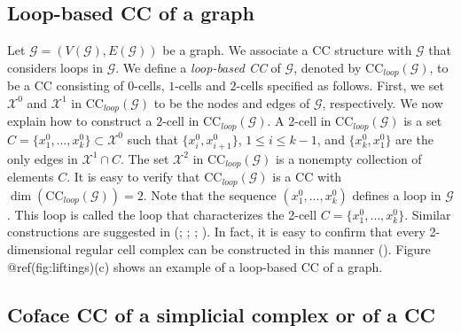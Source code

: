 \documentclass[
  12pt,
]{krantz}
\begin{document}
\subsection{Loop-based CC of a graph}\label{loop-based-cc-of-a-graph}

Let \(\mathcal{G}=(V(\mathcal{G}),E(\mathcal{G}))\) be a graph. We
associate a CC structure with \(\mathcal{G}\) that considers loops in
\(\mathcal{G}\). We define a \emph{loop-based CC} of \(\mathcal{G}\),
denoted by \(\mbox{CC}_{loop}(\mathcal{G})\), to be a CC consisting of
\(0\)-cells, \(1\)-cells and \(2\)-cells specified as follows. First, we
set \(\mathcal{X}^0\) and \(\mathcal{X}^1\) in
\(\mbox{CC}_{loop}(\mathcal{G})\) to be the nodes and edges of
\(\mathcal{G}\), respectively. We now explain how to construct a
\(2\)-cell in \(\mbox{CC}_{loop}(\mathcal{G})\). A 2-cell in
\(\mbox{CC}_{loop}(\mathcal{G})\) is a set
\(C=\{x^0_1, \ldots , x^0_k\} \subset \mathcal{X}^0\) such that
\(\{x^0_i,x^0_{i+1}\}\), \(1 \leq  i \leq k - 1\), and
\(\{x^0_k, x^0_1\}\) are the only edges in \(\mathcal{X}^1 \cap C\). The
set \(\mathcal{X}^2\) in \(\mbox{CC}_{loop}(\mathcal{G})\) is a nonempty
collection of elements \(C\). It is easy to verify that
\(\mbox{CC}_{loop}(\mathcal{G})\) is a CC with
\(\dim(\mbox{CC}_{loop}(\mathcal{G}))=2\). Note that the sequence
\((x^0_1, \ldots , x^0_k)\) defines a loop in \(\mathcal{G}\). This loop
is called the loop that characterizes the 2-cell
\(C=\{x^0_1, \ldots , x^0_k\}\). Similar constructions are suggested in
(;
;
;
). In fact, it is easy to confirm that every
2-dimensional regular cell complex can be constructed in this manner
(). Figure @ref(fig:liftings)(c) shows an example of a
loop-based CC of a graph.

\subsection{Coface CC of a simplicial complex or of a
CC}\label{coface-cc-of-a-simplicial-complex-or-of-a-cc}
\end{document}
